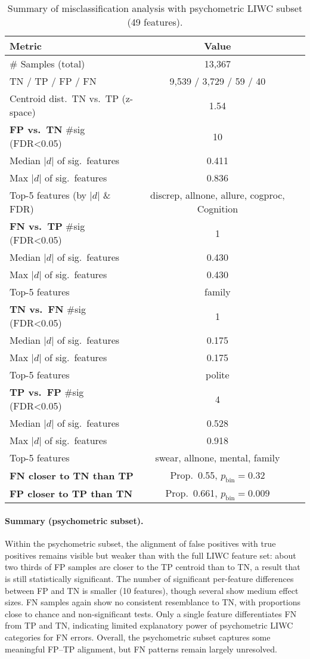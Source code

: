 \begin{table}[H]
\centering
\caption{Summary of misclassification analysis with psychometric LIWC subset (49 features).}
\label{tab:liwc-misclass-psych}
\begin{tabular}{lcc}
\toprule
Metric & Value \\
\midrule
\# Samples (total) & 13,367 \\
TN / TP / FP / FN & 9,539 / 3,729 / 59 / 40 \\
Centroid dist.\ TN vs.\ TP (z-space) & 1.54 \\
\midrule
\textbf{FP vs.\ TN} \#sig (FDR<0.05) & 10 \\
Median $|d|$ of sig.\ features & 0.411 \\
Max $|d|$ of sig.\ features & 0.836 \\
Top-5 features (by $|d|$ \& FDR) & discrep, allnone, allure, cogproc, Cognition \\
\midrule
\textbf{FN vs.\ TP} \#sig (FDR<0.05) & 1 \\
Median $|d|$ of sig.\ features & 0.430 \\
Max $|d|$ of sig.\ features & 0.430 \\
Top-5 features & family \\
\midrule
\textbf{TN vs.\ FN} \#sig (FDR<0.05) & 1 \\
Median $|d|$ of sig.\ features & 0.175 \\
Max $|d|$ of sig.\ features & 0.175 \\
Top-5 features & polite \\
\midrule
\textbf{TP vs.\ FP} \#sig (FDR<0.05) & 4 \\
Median $|d|$ of sig.\ features & 0.528 \\
Max $|d|$ of sig.\ features & 0.918 \\
Top-5 features & swear, allnone, mental, family \\
\midrule
\textbf{FN closer to TN than TP} & Prop.\ 0.55, $p_{\text{bin}}=0.32$ \\
\textbf{FP closer to TP than TN} & Prop.\ 0.661, $p_{\text{bin}}=0.009$ \\
\bottomrule
\end{tabular}
\end{table}

\paragraph{Summary (psychometric subset).}
Within the psychometric subset, the alignment of false positives with true positives remains visible but weaker than with the full LIWC feature set: about two thirds of FP samples are closer to the TP centroid than to TN, a result that is still statistically significant. The number of significant per-feature differences between FP and TN is smaller (10 features), though several show medium effect sizes. FN samples again show no consistent resemblance to TN, with proportions close to chance and non-significant tests. Only a single feature differentiates FN from TP and TN, indicating limited explanatory power of psychometric LIWC categories for FN errors. Overall, the psychometric subset captures some meaningful FP–TP alignment, but FN patterns remain largely unresolved.


